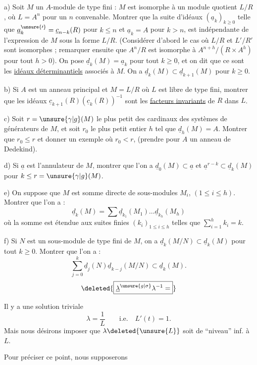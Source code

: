 a) Soit $M$ un $A$-module de type fini : $M$ est isomorphe à un module quotient $L/R$, où $L=A^n$ pour un $n$ convenable. Montrer que la suite d'idéaux $(\underline a_k)_{k\geq0}$ telle que $\underline a_k^{\unsure{\prime}}=\underline c_{n-k}(R)$ pour $k\leq n$ et $\underline a_k=A$ pour $k>n$, est indépendante de l'expression de $M$ sous la forme $L/R$. (Considérer d'abord le cas où $L/R$ et $L'/R'$ sont isomorphes ; remarquer ensuite que $A^n/R$ est isomorphe à $A^{n+h}/(R\times A^h)$ pour tout $h>0$). On pose $\underline d_k(M)=\underline a_k$ pour tout $k\geq0$, et on dit que ce sont les \uline{idéaux déterminantiels} associés à $M$. On a $\underline d_k(M)\subset\underline d_{k+1}(M)$ pour $k\geq0$.

b) Si $A$ est un anneau principal et $M=L/R$ où $L$ est libre de type fini, montrer que les idéaux $\underline c_{k+1}(R)(\underline c_k(R))^{-1}$ sont les \uline{facteurs invariants} de $R$ dans $L$.

c) Soit $r=\unsure{\gamma|g}(M)$ le plus petit des cardinaux des systèmes de générateurs de $M$, et soit $r_0$ le plus petit entier $h$ tel que $\underline d_h(M)=A$. Montrer que $r_0\leq r$ et donner un exemple où $r_0<r$, (prendre pour $A$ un anneau de Dedekind).

d) Si $\underline a$ est l'annulateur de $M$, montrer que l'on a $\underline d_0(M)\subset\underline a$ et $\underline a^{r-k}\subset\underline d_k(M)$ pour $k\leq r=\unsure{\gamma|g}(M)$.

e) On suppose que $M$ est somme directe de sous-modules $M_i$, $(1\leq i\leq h)$. Montrer que l'on a :
\[
\underline d_k(M)=\sum\underline d_{k_1}(M_1)\ldots\underline d_{k_h}(M_h)
\]
où la somme est étendue aux suites finies $(k_i)_{1\leq i\leq h}$ telles que $\sum_{i=1}^h k_i=k$.

f) Si $N$ est un sous-module de type fini de $M$, on a $\underline d_k(M/N)\subset\underline d_k(M)$ pour tout $k\geq0$. Montrer que l'on a :
\[
\sum_{j=0}^k\underline d_j(N)\underline d_{k-j}(M/N)\subset\underline d_k(M).
\]
\[
\deleted{\boxed{\underline\lambda^{\unsure{g|\sigma}}\lambda^{-1}=}}
\]

Il y a une solution triviale
\[
\lambda=\frac1L\qquad\text{i.e.}\quad L'(t)=1.
\]
Mais nous désirons imposer que $\lambda\deleted{\unsure{L}}$ soit de ``niveau''  inf. à $L$.

Pour préciser ce point, nous supposerons

